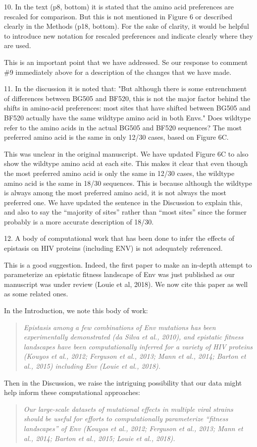 \documentclass[11pt, oneside]{article}   	%
\begin{document}
10. In the text (p8, bottom) it is stated that the amino acid preferences are rescaled for comparison. But this is not mentioned in Figure 6 or described clearly in the Methods (p18, bottom). For the sake of clarity, it would be helpful to introduce new notation for rescaled preferences and indicate clearly where they are used. 

{\color{black}
This is an important point that we have addressed.
Se our response to comment \#9 immediately above for a description of the changes that we have made.}

11. In the discussion it is noted that: "But although there is some entrenchment of differences between BG505 and BF520, this is not the major factor behind the shifts in amino-acid preferences: most sites that have shifted between BG505 and BF520 actually have the same wildtype amino acid in both Envs." Does wildtype refer to the amino acids in the actual BG505 and BF520 sequences? The most preferred amino acid is the same in only 12/30 cases, based on Figure 6C. 

{\color{black}
This was unclear in the original manuscript.
We have updated Figure 6C to also show the wildtype amino acid at each site.
This makes it clear that even though the most preferred amino acid is only the same in 12/30 cases, the wildtype amino acid is the same in 18/30 sequences.
This is because although the wildtype is always among the most preferred amino acid, it is not always the most preferred one.
We have updated the sentence in the Discussion to explain this, and also to say the ``majority of sites'' rather than ``most sites'' since the former probably is a more accurate description of 18/30.}

12. A body of computational work that has been done to infer the effects of epistasis on HIV proteins (including ENV) is not adequately referenced. 

{\color{black}
This is a good suggestion. 
Indeed, the first paper to make an in-depth attempt to parameterize an epistatic fitness landscape of Env was just published as our manuscript was under review (Louie et al, 2018).
We now cite this paper as well as some related ones.

In the Introduction, we note this body of work:
\begin{quote}
\textsl{
Epistasis among a few combinations of Env mutations has been experimentally demonstrated (da Silva et al., 2010), and epistatic fitness landscapes have been computationally inferred for a variety of HIV proteins (Kouyos et al., 2012; Ferguson et al., 2013; Mann et al., 2014; Barton et al., 2015) including Env (Louie et al., 2018).
}
\end{quote}

Then in the Discussion, we raise the intriguing possibility that our data might help inform these computational approaches:
\begin{quote}
\textsl{Our large-scale datasets of mutational effects in multiple viral strains should be useful for efforts to computationally parameterize ``fitness landscapes'' of Env (Kouyos et al., 2012; Ferguson et al., 2013; Mann et al., 2014; Barton et al., 2015; Louie et al., 2018).}
\end{quote}}
\end{document}
